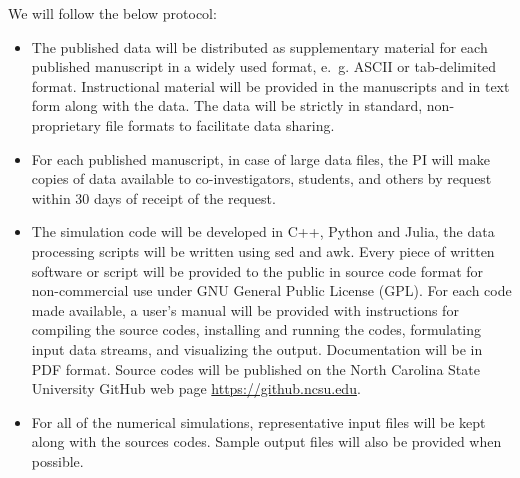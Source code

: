 
We will follow the below protocol: 
\begin{itemize}

	\item 
The published data will be distributed as  supplementary  material for each 
published manuscript in a widely used format, e.~g. 
ASCII or tab-delimited  format. 
Instructional material will be provided in 
the manuscripts and in text form along  with the data. 
The data will be strictly in standard, non-proprietary file formats 
to facilitate  data sharing. 

\item 
For each published manuscript, in case of large data files, 
the PI will make copies of data 
available to co-investigators, students, and
others by request within 30 days of receipt of the request. 
 


	\item
The simulation code will be developed in C++, Python and Julia, 
the data processing  scripts will be written using sed and awk. 
Every piece of written software or script will 
be provided to the public in source code format for non-commercial use 
under GNU General Public License (GPL). 
For each code made available, a user's manual will be provided with
instructions for compiling the source codes, installing and running the codes,
formulating input data streams, and visualizing the output. Documentation will
be in PDF format.
Source codes will be published on the North Carolina State University 
	GitHub web page \url{https://github.ncsu.edu}. 

\item 
For all of the numerical simulations, representative input files will
be kept along with the sources codes. Sample  output files 
will also be provided when possible. 

\end{itemize}
